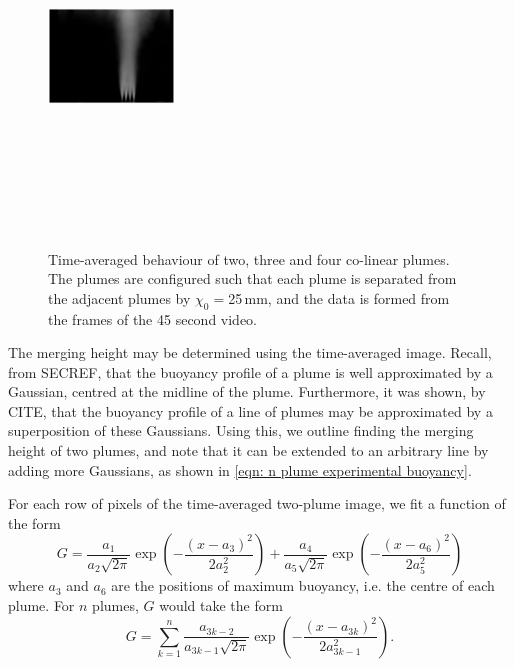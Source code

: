 \documentclass{jfm}
\begin{document}
\begin{figure}
			\includegraphics[trim = {6.5cm 0 4.5cm 2cm},clip,width = 0.3\textwidth,height = 10cm]{fourPlumeAverage.eps}
			\vspace{-4em}
		\caption{ Time-averaged behaviour of two, three and four co-linear plumes. The plumes are configured such that each plume is separated from the adjacent plumes by $\chi_0 = $25\,mm, and the data is formed from the frames of the 45 second video.}
		\label{fig:averaged images}
	\end{figure}
	\noindent The merging height may be determined using the time-averaged image. Recall, from SECREF, that the buoyancy profile of a plume is well approximated by a Gaussian, centred at the midline of the plume. Furthermore, it was shown, by CITE, that the buoyancy profile of a line of plumes may be approximated by a superposition of these Gaussians. Using this, we outline finding the merging height of two plumes, and note that it can be extended to an arbitrary line by adding more Gaussians, as shown in \eqref{eqn: n plume experimental buoyancy}.
	
	\par For each row of pixels of the time-averaged two-plume image, we fit a function of the form 
	\begin{equation}
		G = \dfrac{a_1}{a_2\sqrt{2\pi}}\exp\left(-\dfrac{(x-a_3)^2}{2a_2^2}\right) + \dfrac{a_4}{a_5\sqrt{2\pi}}\exp\left(-\dfrac{(x-a_6)^2}{2a_5^2}\right)\label{eqn:two plume experimental gaussian} 
	\end{equation}
	where $a_3$ and $a_6$ are the positions of maximum buoyancy, i.e. the centre of each plume. 
	For $n$ plumes, $G$ would take the form
	\begin{equation}
		G = \sum_{k = 1}^n \frac{a_{3k-2}}{a_{3k-1} \sqrt{2\pi}} \exp\left(-\frac{(x - a_{3k})^2}{2a_{3k-1}^2}\right). \label{eqn: n plume experimental buoyancy}
	\end{equation}
\end{document}
